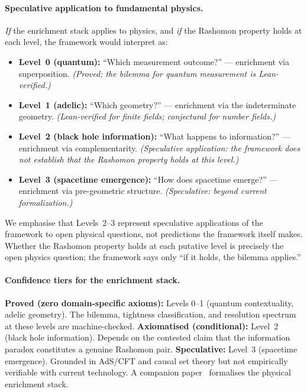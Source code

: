 \documentclass[11pt,a4paper]{article}
\begin{document}
\paragraph{Speculative application to fundamental physics.}
\emph{If} the enrichment stack applies to physics, and \emph{if} the
Rashomon property holds at each level, the framework would interpret as:
\begin{itemize}
  \item \textbf{Level~0 (quantum):} ``Which measurement outcome?'' --- enrichment via superposition. \emph{(Proved; the bilemma for quantum measurement is Lean-verified.)}
  \item \textbf{Level~1 (adelic):} ``Which geometry?'' --- enrichment via the indeterminate geometry. \emph{(Lean-verified for finite fields; conjectural for number fields.)}
  \item \textbf{Level~2 (black hole information):} ``What happens to information?'' --- enrichment via complementarity. \emph{(Speculative application: the framework does not establish that the Rashomon property holds at this level.)}
  \item \textbf{Level~3 (spacetime emergence):} ``How does spacetime emerge?'' --- enrichment via pre-geometric structure. \emph{(Speculative: beyond current formalization.)}
\end{itemize}
We emphasise that Levels~2--3 represent speculative applications of
the framework to open physical questions, not predictions the framework
itself makes.  Whether the Rashomon property holds at each putative
level is precisely the open physics question; the framework says only
``if it holds, the bilemma applies.''

\paragraph{Confidence tiers for the enrichment stack.}
\textbf{Proved (zero domain-specific axioms):} Levels 0--1 (quantum contextuality, adelic geometry). The bilemma, tightness classification, and resolution spectrum at these levels are machine-checked.
\textbf{Axiomatised (conditional):} Level~2 (black hole information). Depends on the contested claim that the information paradox constitutes a genuine Rashomon pair.
\textbf{Speculative:} Level~3 (spacetime emergence). Grounded in AdS/CFT and causal set theory but not empirically verifiable with current technology. A companion paper~\citep{caraker2026ostrowski} formalises the physical enrichment stack.
\end{document}
